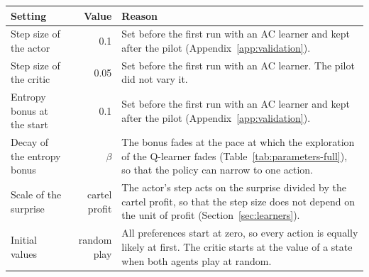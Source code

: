\begin{tabular}{@{}lr>{\raggedright\arraybackslash}p{8.75cm}@{}}
\toprule
Setting & Value & Reason \\
\midrule
Step size of the actor & 0.1 & Set before the first run with an AC learner and kept after the pilot (Appendix~\ref{app:validation}). \\
Step size of the critic & 0.05 & Set before the first run with an AC learner. The pilot did not vary it. \\
Entropy bonus at the start & 0.1 & Set before the first run with an AC learner and kept after the pilot (Appendix~\ref{app:validation}). \\
Decay of the entropy bonus & $\beta$ & The bonus fades at the pace at which the exploration of the Q-learner fades (Table~\ref{tab:parameters-full}), so that the policy can narrow to one action. \\
Scale of the surprise & cartel profit & The actor's step acts on the surprise divided by the cartel profit, so that the step size does not depend on the unit of profit (Section~\ref{sec:learners}). \\
Initial values & random play & All preferences start at zero, so every action is equally likely at first. The critic starts at the value of a state when both agents play at random. \\
\bottomrule
\end{tabular}
